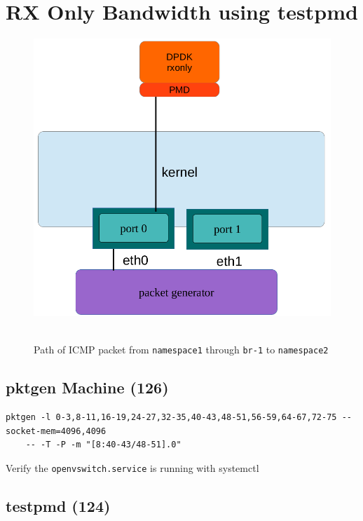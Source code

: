 \documentclass[letter]{article}
\begin{document}
\section{RX Only Bandwidth using testpmd}
{\setlength{\parindent}{0cm}

\begin{figure}[H]
\caption{Path of ICMP packet from \texttt{namespace1} through \texttt{br-1} to \texttt{namespace2}}
\hbox{\includegraphics[scale=0.6]{rx-only} }
\end{figure}

\subsection{pktgen Machine (126)}

\begin{lstlisting}
pktgen -l 0-3,8-11,16-19,24-27,32-35,40-43,48-51,56-59,64-67,72-75 --socket-mem=4096,4096 
	-- -T -P -m "[8:40-43/48-51].0"
\end{lstlisting}

Verify the \texttt{openvswitch.service} is running with systemctl

\subsection{testpmd (124)}

}
\end{document}
